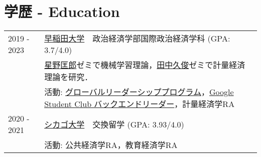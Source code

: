 \documentclass[uplatex,dvipdfmx,a4paper,11pt]{jsarticle}
\begin{document}
\section{学歴 - Education}
\begin{tabularx}{\linewidth}{@{}l X@{}}	
2019 - 2023 & \uline{早稲田大学}　政治経済学部国際政治経済学科 \hfill \normalsize (GPA: 3.7/4.0) \\
&  \href{https://tadaohoshino.wordpress.com/}{星野匡郎}ゼミで機械学習理論，\href{https://waseda.pure.elsevier.com/en/persons/hisatoshi-tanaka}{田中久俊}ゼミで計量経済理論を研究．\\
& 活動: \href{http://www2.cie-waseda.jp/glfp/jp/about/program.html}{グローバルリーダーシッププログラム}，\href{https://gdsc.community.dev/waseda-university/}{Google Student Club バックエンドリーダー}，計量経済学RA\\
2020 - 2021 & \uline{シカゴ大学}　交換留学 \hfill (GPA: 3.93/4.0) \\
& 活動: 公共経済学RA，教育経済学RA
\end{tabularx}



\end{document}
